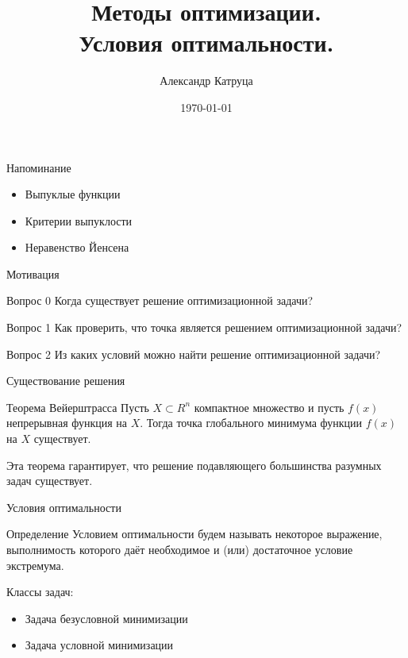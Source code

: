 \documentclass[12pt]{beamer}
\title[Условия оптимальности]{Методы оптимизации. \\
 Условия оптимальности.}
\author{Александр Катруца}
\institute{Московский физико-технический институт}
\date{\today}
\begin{document}
\begin{frame}
\maketitle
\end{frame}

\begin{frame}{Напоминание}
\begin{itemize}
\item Выпуклые функции
\item Критерии выпуклости
\item Неравенство Йенсена
\end{itemize}
\end{frame}

\begin{frame}{Мотивация}

\begin{block}{Вопрос 0}
Когда существует решение оптимизационной задачи?
\end{block}

\begin{block}{Вопрос 1}
Как проверить, что точка является решением оптимизационной задачи? 
\end{block}

\begin{block}{Вопрос 2}
Из каких условий можно найти решение оптимизационной задачи?
\end{block}

\end{frame}

\begin{frame}{Существование решения}
\begin{block}{Теорема Вейерштрасса}
Пусть $X \subset R^n$ компактное множество и пусть $f(x)$ непрерывная функция на $X$. 
Тогда точка глобального минимума функции $f (x)$ на $X$ существует.
\end{block}

Эта теорема гарантирует, что решение подавляющего большинства разумных задач существует.
 
\end{frame}

\begin{frame}{Условия оптимальности}
\begin{block}{Определение}
Условием оптимальности будем называть некоторое выражение, выполнимость которого даёт необходимое и (или) достаточное условие экстремума. 
\end{block}
Классы задач:
\begin{itemize}
\item Задача безусловной минимизации
\item Задача условной минимизации
\end{itemize}
\end{frame}
\end{document}
